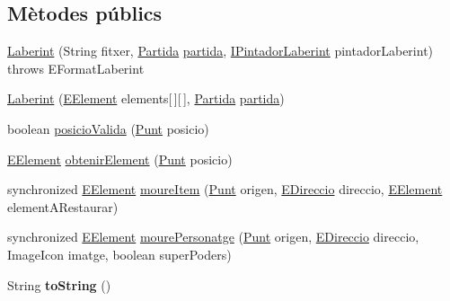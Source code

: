 \subsection*{Mètodes públics}
\begin{DoxyCompactItemize}
\item 
\hyperlink{classlogica_1_1laberints_1_1_laberint_a17654384a8abae885f2cf50c9fa7cfa1}{Laberint} (String fitxer, \hyperlink{classlogica_1_1_partida}{Partida} \hyperlink{classlogica_1_1laberints_1_1_laberint_a7183ce070714f73e078bb36e8c21b575}{partida}, \hyperlink{interfaceinterficie_1_1_i_pintador_laberint}{I\+Pintador\+Laberint} pintador\+Laberint)  throws E\+Format\+Laberint
\item 
\hyperlink{classlogica_1_1laberints_1_1_laberint_aadddfcf8789a27b7bf2fae055801abe5}{Laberint} (\hyperlink{enumlogica_1_1enumeracions_1_1_e_element}{E\+Element} elements\mbox{[}$\,$\mbox{]}\mbox{[}$\,$\mbox{]}, \hyperlink{classlogica_1_1_partida}{Partida} \hyperlink{classlogica_1_1laberints_1_1_laberint_a7183ce070714f73e078bb36e8c21b575}{partida})
\item 
boolean \hyperlink{classlogica_1_1laberints_1_1_laberint_a91596ecf3d32f4dfd732c45bec1bd02e}{posicio\+Valida} (\hyperlink{classlogica_1_1_punt}{Punt} posicio)
\item 
\hyperlink{enumlogica_1_1enumeracions_1_1_e_element}{E\+Element} \hyperlink{classlogica_1_1laberints_1_1_laberint_a99ff8e97f8082b5a0d9dd7964773216a}{obtenir\+Element} (\hyperlink{classlogica_1_1_punt}{Punt} posicio)
\item 
synchronized \hyperlink{enumlogica_1_1enumeracions_1_1_e_element}{E\+Element} \hyperlink{classlogica_1_1laberints_1_1_laberint_a94464a4d4905f10bdad3ef4d4ec2ebb4}{moure\+Item} (\hyperlink{classlogica_1_1_punt}{Punt} origen, \hyperlink{enumlogica_1_1enumeracions_1_1_e_direccio}{E\+Direccio} direccio, \hyperlink{enumlogica_1_1enumeracions_1_1_e_element}{E\+Element} element\+A\+Restaurar)
\item 
synchronized \hyperlink{enumlogica_1_1enumeracions_1_1_e_element}{E\+Element} \hyperlink{classlogica_1_1laberints_1_1_laberint_a04c988eb6a665553733b7b2aede683f6}{moure\+Personatge} (\hyperlink{classlogica_1_1_punt}{Punt} origen, \hyperlink{enumlogica_1_1enumeracions_1_1_e_direccio}{E\+Direccio} direccio, Image\+Icon imatge, boolean super\+Poders)
\item 
\hypertarget{classlogica_1_1laberints_1_1_laberint_a445a31e1cf30bacd1c7c8b71b41f2941}{String {\bfseries to\+String} ()}\label{classlogica_1_1laberints_1_1_laberint_a445a31e1cf30bacd1c7c8b71b41f2941}


\end{DoxyCompactItemize}
